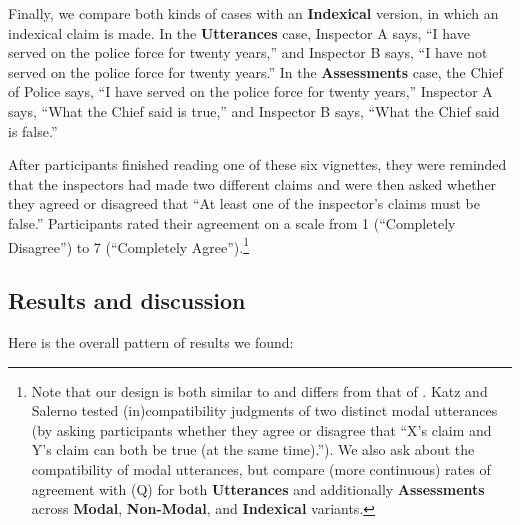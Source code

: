 \documentclass[11pt]{article}
\begin{document}
\begin{doublespace}
Finally, we compare both kinds of cases with an {\bf Indexical} version, in which an indexical claim is made. In the \textbf{Utterances} case, Inspector A says, ``I have served on the police force for twenty years,'' and Inspector B says, ``I have not served on the police force for twenty years.'' In the \textbf{Assessments} case, the Chief of Police says, ``I have served on the police force for twenty years,''  Inspector A says, ``What the Chief said is true,'' and Inspector B says, ``What the Chief said is false.'' %

After participants finished reading one of these six vignettes, they were reminded that the inspectors had made two different claims and were then asked whether they agreed or disagreed that ``At least one of the inspector's claims must be false.'' Participants rated their agreement on a scale from 1 (``Completely Disagree'') to 7 (``Completely Agree'').\footnote{Note that our design is both similar to and differs from that of \cite{katz:2017}. Katz and Salerno tested (in)compatibility judgments of two distinct modal utterances (by asking participants whether they agree or disagree that ``X's claim and Y's claim can both be true (at the same time).''). We also ask about the compatibility of modal utterances, but compare (more continuous) rates of agreement with (Q) for both {\bf Utterances} and additionally {\bf Assessments} across {\bf Modal}, {\bf Non-Modal}, and {\bf Indexical} variants.}

\subsection{Results and discussion}
\label{2.3}

Here is the overall pattern of results we found:


\end{doublespace}
\end{document}
